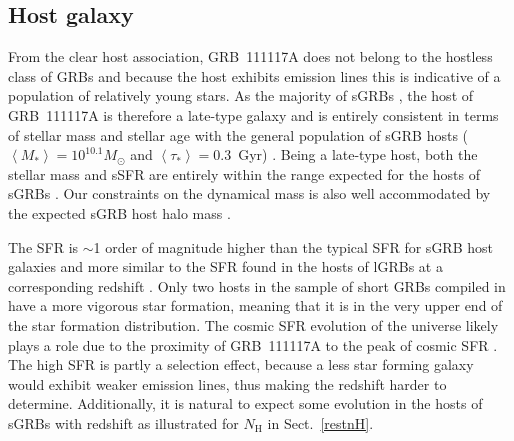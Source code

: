 \documentclass{aa}    %
\begin{document}
\subsection{Host galaxy}

From the clear host association, GRB~111117A does not belong to the hostless
class of GRBs \citep{Berger2010a} and because the host exhibits emission lines
this is indicative of a population of relatively young stars. As the majority of
sGRBs \citep{Fong2013b}, the host of GRB~111117A is therefore a late-type galaxy
and is entirely consistent in terms of stellar mass and stellar age with the
general population of sGRB hosts ($\left\langle M _* \right\rangle = 10^{10.1}
M_{\odot}$ and $\left\langle \tau _* \right\rangle = 0.3 $~Gyr)
\citep{Leibler2010}. Being a late-type host, both the stellar mass and sSFR are
entirely within the range expected for the hosts of sGRBs \citep{Behroozi2014}.
Our constraints on the dynamical mass is also well accommodated by the expected sGRB
host halo mass \citep{Behroozi2014}.

The SFR is $\sim$1 order of magnitude higher than the typical SFR for sGRB host
galaxies \citep{Berger2014} and more similar to the SFR found in the hosts of
lGRBs at a corresponding redshift \citep{Kruhler2015}. Only two hosts in the
sample of short GRBs compiled in \citet{Berger2014} have a more vigorous star
formation, meaning that it is in the very upper end of the star formation
distribution. The cosmic SFR evolution of the universe likely plays a role due
to the proximity of GRB~111117A to the peak of cosmic SFR \citep{Madau2014}.
The high SFR is partly a selection effect, because a less star forming galaxy
would exhibit weaker emission lines, thus making the redshift harder to
determine. Additionally, it is natural to expect some evolution in the hosts of
sGRBs with redshift as illustrated for $N_\mathrm{H}$ in Sect.~\ref{restnH}.
\end{document}
